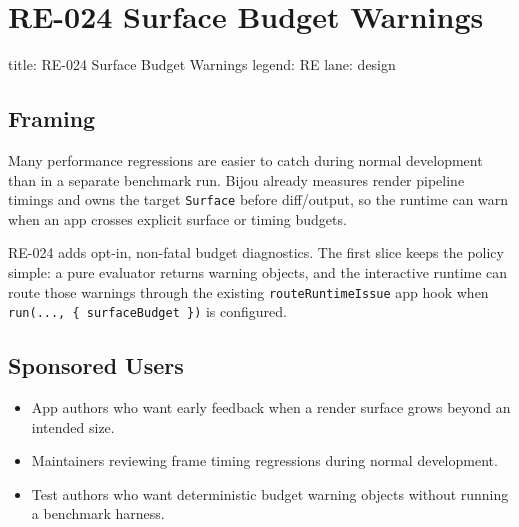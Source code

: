 \chapter{RE-024 Surface Budget Warnings}\label{record-157}

\smallskip

\begin{RecordMeta}
title: RE-024 Surface Budget Warnings
legend: RE
lane: design

\end{RecordMeta}

\section{Framing}\label{record-157-framing}

Many performance regressions are easier to catch during normal development than in a separate benchmark run. Bijou already measures render pipeline timings and owns the target \texttt{S\allowbreak{}u\allowbreak{}r\allowbreak{}f\allowbreak{}a\allowbreak{}c\allowbreak{}e} before diff/output, so the runtime can warn when an app crosses explicit surface or timing budgets.

RE-024 adds opt-in, non-fatal budget diagnostics. The first slice keeps the policy simple: a pure evaluator returns warning objects, and the interactive runtime can route those warnings through the existing \texttt{r\allowbreak{}o\allowbreak{}u\allowbreak{}t\allowbreak{}e\allowbreak{}R\allowbreak{}u\allowbreak{}n\allowbreak{}t\allowbreak{}i\allowbreak{}m\allowbreak{}e\allowbreak{}I\allowbreak{}s\allowbreak{}s\allowbreak{}u\allowbreak{}e} app hook when \texttt{r\allowbreak{}u\allowbreak{}n\allowbreak{}(\allowbreak{}.\allowbreak{}.\allowbreak{}.\allowbreak{},\allowbreak{} \allowbreak{}\{\allowbreak{} \allowbreak{}s\allowbreak{}u\allowbreak{}r\allowbreak{}f\allowbreak{}a\allowbreak{}c\allowbreak{}e\allowbreak{}B\allowbreak{}u\allowbreak{}d\allowbreak{}g\allowbreak{}e\allowbreak{}t\allowbreak{} \allowbreak{}\}\allowbreak{})} is configured.

\section{Sponsored Users}\label{record-157-sponsored-users}

\begin{itemize}
\tightlist
\item
  App authors who want early feedback when a render surface grows beyond an intended size.
\item
  Maintainers reviewing frame timing regressions during normal development.
\item
  Test authors who want deterministic budget warning objects without running a benchmark harness.
\end{itemize}

